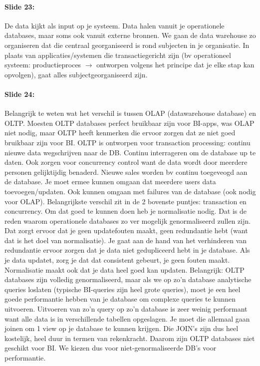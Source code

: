 \documentclass[10pt,a4paper]{report}
\begin{document}
\paragraph{Slide 23:}De data kijkt als input op je systeem. Data halen vanuit je operationele databases, maar soms ook vanuit externe bronnen. We gaan de data warehouse zo organiseren dat die centraal georganiseerd is rond subjecten in je organisatie. In plaats van applicaties/systemen die transactiegericht zijn (bv operationeel systeem: productieproces $\rightarrow$ ontworpen volgens het principe dat je elke stap kan opvolgen), gaat alles subjectgeorganiseerd zijn.

\paragraph{Slide 24:}Belangrijk te weten wat het verschil is tussen OLAP (datawarehouse database) en OLTP. Moesten OLTP databases perfect bruikbaar zijn voor BI-apps, was OLAP niet nodig, maar OLTP heeft kenmerken die ervoor zorgen dat ze niet goed bruikbaar zijn voor BI. OLTP is ontworpen voor transaction processing: continu nieuwe data wegschrijven naar de DB. Continu interrageren om de database up te daten. Ook zorgen voor concurrency control want de data wordt door meerdere personen gelijktijdig benaderd. Nieuwe sales worden bv continu toegeveogd aan de database. Je moet ermee kunnen omgaan dat meerdere users data toevoegen/updaten. Ook kunnen omgaan met failures van de database (ook nodig voor OLAP). Belangrijkste verschil zit in de 2 bovenste puntjes: transaction en concurrency. Om dat goed te kunnen doen heb je normalisatie nodig. Dat is de reden waarom operationele databases zo ver mogelijk genormaliseerd zullen zijn. Dat zorgt ervoor dat je geen updatefouten maakt, geen redundantie hebt (want dat is het doel van normalisatie). Je gaat aan de hand van het verhinderen van redundantie ervoor zorgen dat je data niet gedupliceerd hebt in je database. Als je data updatet, zorg je dat dat consistent gebeurt, je geen fouten maakt. Normalisatie maakt ook dat je data heel goed kan updaten. Belangrijk: OLTP databases zijn volledig genormaliseerd, maar als we op zo'n database analytische queries loslaten (typische BI-queries zijn heel grote queries), moet je een heel goede performantie hebben van je database om complexe queries te kunnen uitvoeren. Uitvoeren van zo'n query op zo'n database is zeer weinig performant want alle data is in verschillende tabellen opgeslagen. Je moet die allemaal gaan joinen om 1 view op je database te kunnen krijgen. Die JOIN's zijn dus heel kostelijk, heel duur in termen van rekenkracht. Daarom zijn OLTP databases niet geschikt voor BI. We kiezen dus voor niet-genormaliseerde DB's voor performantie.
\end{document}
